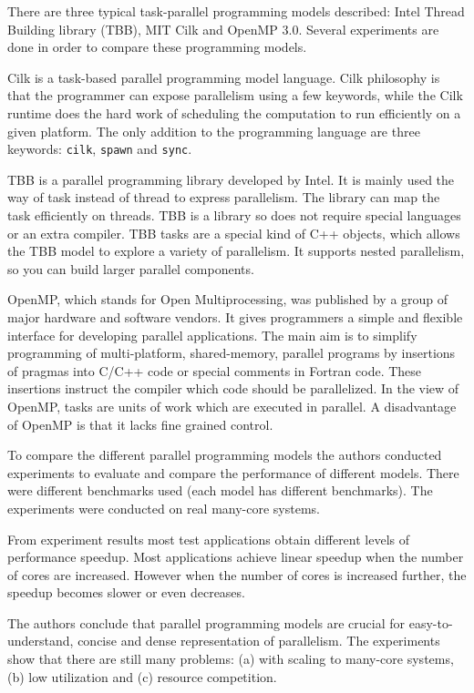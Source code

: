 There are three typical task-parallel programming models described: Intel
Thread Building library (TBB), MIT Cilk and OpenMP 3.0. Several experiments are done in order to compare these programming models. 

Cilk is a task-based parallel programming model language. Cilk philosophy is
that the programmer can expose parallelism using a few keywords, while the Cilk
runtime does the hard work of scheduling the computation to run efficiently on
a given platform. The only addition to the programming language are three
keywords: \texttt{cilk}, \texttt{spawn} and \texttt{sync}.

TBB is a parallel programming library developed by Intel. It is mainly used the
way of task instead of thread to express parallelism. The library can map the
task efficiently on threads. TBB is a library so does not require special
languages or an extra compiler. TBB tasks are a special kind of C++ objects,
which allows the TBB model to explore a variety of parallelism. It supports
nested parallelism, so you can build larger parallel components.

OpenMP, which stands for Open Multiprocessing, was published by a group of
major hardware and software vendors. It gives programmers a simple and flexible
interface for developing parallel applications. The main aim is to simplify
programming of multi-platform, shared-memory, parallel programs by insertions
of pragmas into C/C++ code or special comments in Fortran code. These
insertions instruct the compiler which code should be parallelized. In the view
of OpenMP, tasks are units of work which are executed in parallel. A
disadvantage of OpenMP is that it lacks fine grained control.

To compare the different parallel programming models the authors conducted
experiments to evaluate and compare the performance of different models. There
were different benchmarks used (each model has different benchmarks). The
experiments were conducted on real many-core systems.

From experiment results most test applications obtain different levels of
performance speedup. Most applications achieve linear speedup when the number
of cores are increased. However when the number of cores is increased further,
the speedup becomes slower or even decreases.

The authors conclude that parallel programming models are crucial for
easy-to-understand, concise and dense representation of parallelism. The
experiments show that there are still many problems: (a) with scaling to
many-core systems, (b) low utilization and (c) resource competition.

